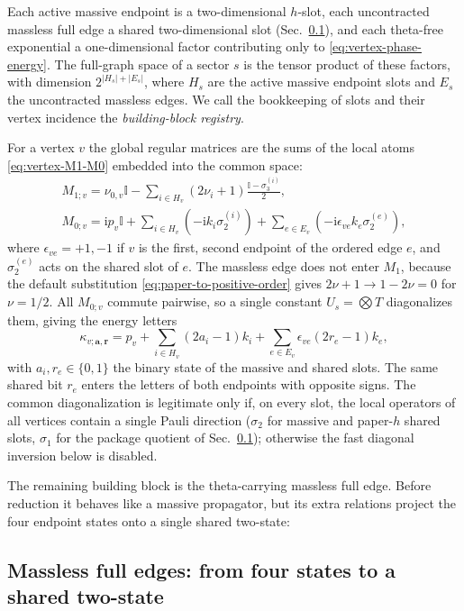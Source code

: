 \documentclass[11pt,a4paper]{article}
\newcommand{\ii}{\mathrm i}
\newcommand{\Id}{\mathbb I}
\begin{document}
Each active massive endpoint is a two-dimensional $h$-slot, each uncontracted massless full edge a
shared two-dimensional slot (Sec.~\ref{sec:massless}), and each theta-free exponential a
one-dimensional factor contributing only to \eqref{eq:vertex-phase-energy}. The full-graph space of
a sector $s$ is the tensor product of these factors, with dimension $2^{|H_s|+|E_s|}$, where
$H_s$ are the active massive endpoint slots and $E_s$ the uncontracted massless edges. We call the
bookkeeping of slots and their vertex incidence the \emph{building-block registry}.

For a vertex $v$ the global regular matrices are the sums of the local atoms \eqref{eq:vertex-M1-M0}
embedded into the common space:
\begin{align}
  M_{1;v}
  =\nu_{0,v}\Id
  -\sum_{i\in H_v}(2\nu_i+1)\frac{\Id-\sigma_3^{(i)}}{2},
  \label{eq:global-M1}\\
  M_{0;v}
  =\ii p_v\Id
  +\sum_{i\in H_v}(-\ii k_i\sigma_2^{(i)})
  +\sum_{e\in E_v}(-\ii\epsilon_{ve}k_e\sigma_2^{(e)}),
  \label{eq:global-M0}
\end{align}
where $\epsilon_{ve}=+1,-1$ if $v$ is the first, second endpoint of the ordered edge $e$, and
$\sigma_2^{(e)}$ acts on the shared slot of $e$. The massless edge does not enter $M_1$, because the
default substitution \eqref{eq:paper-to-positive-order} gives $2\nu+1\to1-2\nu=0$ for
$\nu=1/2$. All $M_{0;v}$ commute pairwise, so a single constant
$U_s=\bigotimes T$ diagonalizes them, giving the energy letters
\begin{equation}
  \kappa_{v;\bm a,\bm r}
  =p_v
  +\sum_{i\in H_v}(2a_i-1)k_i
  +\sum_{e\in E_v}\epsilon_{ve}(2r_e-1)k_e,
  \label{eq:global-energy-letter}
\end{equation}
with $a_i,r_e\in\{0,1\}$ the binary state of the massive and shared slots. The same shared bit $r_e$
enters the letters of both endpoints with opposite signs. The common diagonalization is legitimate
only if, on every slot, the local operators of all vertices contain a single Pauli direction
($\sigma_2$ for massive and paper-$h$ shared slots, $\sigma_1$ for the package quotient of
Sec.~\ref{sec:massless}); otherwise the fast diagonal inversion below is disabled.

The remaining building block is the theta-carrying massless full edge. Before reduction it behaves
like a massive propagator, but its extra relations project the four endpoint states onto a single
shared two-state:

\subsection{Massless full edges: from four states to a shared two-state}
\label{sec:massless}
\end{document}
